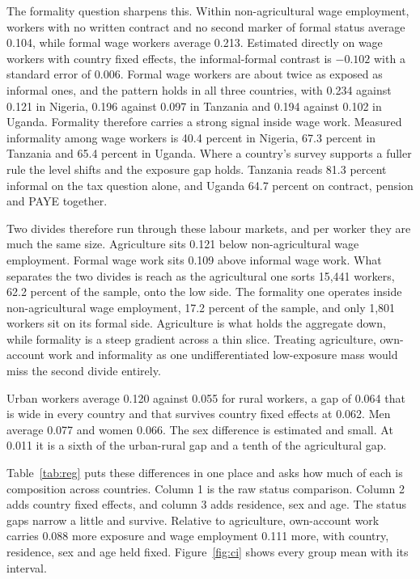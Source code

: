 The formality question sharpens this. Within non-agricultural wage employment,
workers with no written contract and no second marker of formal status average
0.104, while formal wage workers average 0.213. Estimated directly on wage
workers with country fixed effects, the informal-formal contrast is $-0.102$
with a standard error of 0.006. Formal wage workers are about twice as exposed
as informal ones, and the pattern holds in all three countries, with
0.234 against 0.121 in Nigeria, 0.196 against 0.097 in Tanzania and 0.194
against 0.102 in Uganda. Formality therefore carries a strong signal inside wage
work. Measured informality among wage workers is 40.4 percent in Nigeria, 67.3
percent in Tanzania and 65.4 percent in Uganda. Where a country's survey
supports a fuller rule the level shifts and the exposure gap holds. Tanzania
reads 81.3 percent informal on the tax question alone, and Uganda 64.7 percent
on contract, pension and PAYE together.

Two divides therefore run through these labour markets, and per worker they are
much the same size. Agriculture sits 0.121 below non-agricultural wage
employment. Formal wage work sits 0.109 above informal wage work. What separates
the two divides is reach as the agricultural one sorts 15,441 workers, 62.2
percent of the sample, onto the low side. The formality one operates inside
non-agricultural wage employment, 17.2 percent of the sample, and only 1,801
workers sit on its formal side. Agriculture is what holds the aggregate down,
while formality is a steep gradient across a thin slice. Treating agriculture,
own-account work and informality as one undifferentiated low-exposure mass would
miss the second divide entirely.

Urban workers average 0.120 against
0.055 for rural workers, a gap of 0.064 that is wide in every country and that
survives country fixed effects at 0.062. Men average 0.077 and women 0.066. The
sex difference is estimated and small. At 0.011 it is a sixth of the
urban-rural gap and a tenth of the agricultural gap.

Table~\ref{tab:reg} puts these differences in one place and asks how much of
each is composition across countries. Column 1 is the raw status comparison.
Column 2 adds country fixed effects, and column 3 adds residence, sex and age.
The status gaps narrow a little and survive. Relative to agriculture,
own-account work carries 0.088 more exposure and wage employment 0.111 more,
with country, residence, sex and age held fixed. Figure~\ref{fig:ci} shows every
group mean with its interval.

